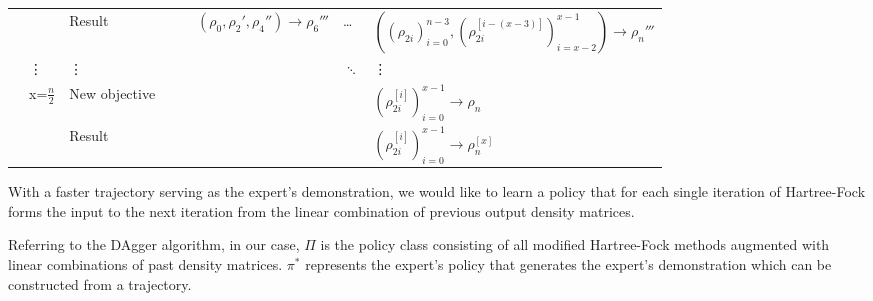 \documentclass[twoside,11pt]{article}
\begin{document}
\begin{center}
\begin{table}[t]
\begin{tabular}{|l|l|l|l|l|l|l|l|}
	&                 & Result &                 &                 & $(\rho_0,\rho_2',\rho_4'')  \rightarrow \rho_6'''$ &  \ldots & $((\rho_{2i})_{i=0}^{n-3} ,(\rho_{2i}^{[i-(x-3)]})_{i=x-2}^{x-1})\rightarrow \rho_{n}'''$      \\ \cline{2-8} 
	& \vdots      & \vdots      &                &                &                & $\ddots$ &   \vdots \\ \cline{2-8} 
	& \multirow{2}{*}{ x=$\frac{n}{2}$} & New objective         &                         &                          &                            &  & $(\rho_{2i}^{[i]})_{i=0}^{x-1} \rightarrow \rho_{n}$     \\ \cline{3-8} 
	&                & Result  &                &                &                &  & $(\rho_{2i}^{[i]})_{i=0}^{x-1}\rightarrow \rho_{n}^{[x]}$ \\ \hline
	\end{tabular}
	\end{table}
\end{center} 




% 

With a faster trajectory serving as the expert's demonstration, we would like to learn a policy that for each single iteration of Hartree-Fock forms the input to the next iteration from the linear combination of previous output density matrices.   

Referring to the DAgger algorithm, in our case, $\Pi$ is the policy class consisting of all modified Hartree-Fock methods augmented with linear combinations of past density matrices. $\pi^*$ represents the expert's policy that generates the expert's demonstration which can be constructed from a trajectory. 


\end{document}
